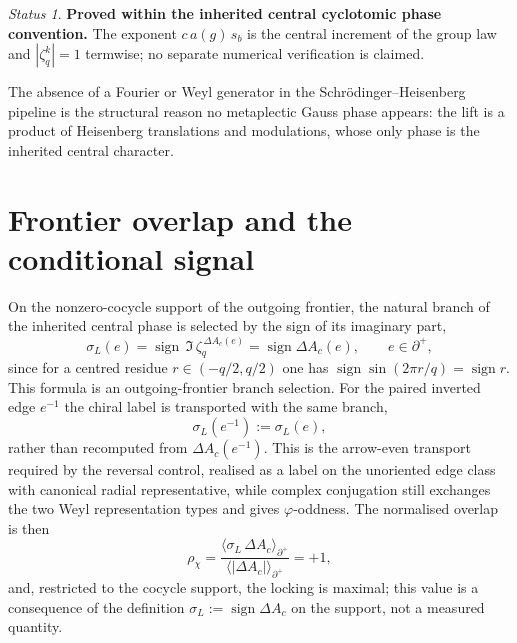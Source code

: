 \documentclass[11pt]{article}
\theoremstyle{plain}
\theoremstyle{remark}
\newtheorem*{status}{Status}
\newcommand{\zq}{\zeta_q}
\newcommand{\dac}{\Delta A_c}
\newcommand{\rhochi}{\rho_\chi}
\newcommand{\sgn}{\operatorname{sign}}
\begin{document}
    \begin{status}\textbf{Proved within the inherited central cyclotomic phase convention.}
      The exponent $c\,a(g)\,s_b$ is the central increment of the group law and $|\zq^k|=1$ termwise; no separate
      numerical verification is claimed.\end{status}

    The absence of a Fourier or Weyl generator in the Schr\"odinger--Heisenberg pipeline is the structural reason no
    metaplectic Gauss phase appears: the lift is a product of Heisenberg translations and modulations, whose only phase is
    the inherited central character.

  \section{Frontier overlap and the conditional signal}

    On the nonzero-cocycle support of the outgoing frontier, the natural branch of the inherited central phase is selected
    by the sign of its imaginary part,
    \begin{equation}
      \sigma_L(e) = \sgn\,\Im\,\zq^{\,\dac(e)} = \sgn \dac(e),
      \qquad e\in\partial^+,
    \end{equation}
    since for a centred residue $r\in(-q/2,q/2)$ one has $\sgn\sin(2\pi r/q) = \sgn r$.
    This formula is an outgoing-frontier branch selection.
    For the paired inverted edge $e^{-1}$ the chiral label is transported with the same branch,
    \begin{equation}
      \sigma_L(e^{-1}) := \sigma_L(e),
    \end{equation}
    rather than recomputed from $\dac(e^{-1})$.
    This is the arrow-even transport required by the reversal control, realised as a label on the unoriented edge class
    with canonical radial representative, while complex conjugation still exchanges the two Weyl representation types and
    gives $\varphi$-oddness.
    The normalised overlap is then
    \begin{equation}
      \rhochi = \frac{\langle \sigma_L\,\dac\rangle_{\partial^+}}{\langle |\dac|\rangle_{\partial^+}} = +1,
    \end{equation}
    and, restricted to the cocycle support, the locking is maximal; this value is a consequence of the definition
    $\sigma_L:=\sgn\dac$ on the support, not a measured quantity.
\end{document}

